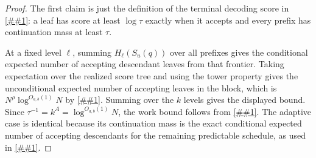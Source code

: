\documentclass[10pt]{article}
\newcommand{\cref}[1]{\ref{##1}}
\theoremstyle{definition}
\begin{document}
\begin{proof}
   The first claim is just the definition of the terminal decoding score in
   \cref{lem:continuation-list-certificate}: a leaf has score at least
   \(\log\tau\) exactly when it accepts and every prefix has continuation mass
   at least \(\tau\).

   At a fixed level \(\ell\), summing \(H_\ell(S_u(q))\) over all prefixes
   gives the conditional expected number of accepting descendant leaves from
   that frontier.  Taking expectation over the realized score tree and using
   the tower property gives the unconditional expected number of accepting
   leaves in the block, which is \(N^\rho\log^{O_{a,b}(1)}N\) by
   \cref{cor:budgeted-block}.  Summing over the \(k\) levels gives the displayed
   bound.  Since \(\tau^{-1}=k^A=\log^{O_{a,b}(1)}N\), the work bound follows
   from \cref{lem:continuation-list-certificate}.  The adaptive case is
   identical because its continuation mass is the exact conditional expected
   number of accepting descendants for the remaining predictable schedule, as
   used in \cref{lem:adaptive-continuation}.
\end{proof}
\end{document}
